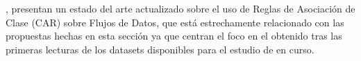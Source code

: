\cite{FMenaHLeonHPalancar-ClasificacionBasadaEnCARFlujosDeDatos-2013}, presentan un estado del arte actualizado sobre el uso de Reglas de Asociación de Clase (CAR) sobre Flujos de Datos, que está estrechamente relacionado con las propuestas hechas en esta sección ya que centran el foco en el \clasificador obtenido tras las primeras lecturas de los datasets disponibles para el estudio de \clasificacion en curso.



